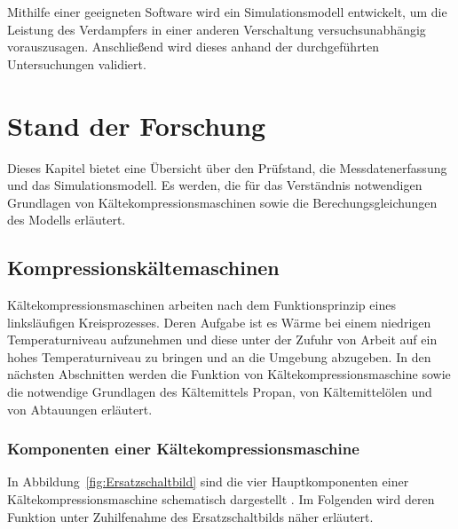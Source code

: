 Mithilfe einer geeigneten Software wird ein Simulationsmodell entwickelt, um die Leistung des Verdampfers in einer anderen Verschaltung versuchsunabhängig vorauszusagen. Anschließend wird dieses anhand der durchgeführten Untersuchungen validiert. 


\chapter{Stand der Forschung}
\label{cha:Technik}

Dieses Kapitel bietet eine Übersicht über den Prüfstand, die Messdatenerfassung und das Simulationsmodell. Es werden, die für das Verständnis notwendigen Grundlagen von Kältekompressionsmaschinen sowie die Berechungsgleichungen des Modells erläutert.

\section{Kompressionskältemaschinen}
\label{sec:Stand der Technik}

Kältekompressionsmaschinen arbeiten nach dem Funktionsprinzip eines linksläufigen Kreisprozesses. Deren Aufgabe ist es Wärme bei einem niedrigen Temperaturniveau aufzunehmen und diese unter der Zufuhr von Arbeit auf ein hohes Temperaturniveau zu bringen und an die Umgebung abzugeben. In den nächsten Abschnitten werden die Funktion von Kältekompressionsmaschine sowie die notwendige Grundlagen des Kältemittels Propan, von Kältemittelölen und von Abtauungen erläutert.

\subsection{Komponenten einer Kältekompressionsmaschine}
\label{subsec:Komponenten einer Kältekompressionsmaschine}

In Abbildung~\ref{fig:Ersatzschaltbild} sind die vier Hauptkomponenten einer Kältekompressionsmaschine schematisch dargestellt \cite{Korner.2017}. Im Folgenden wird deren Funktion unter Zuhilfenahme des Ersatzschaltbilds näher erläutert.

